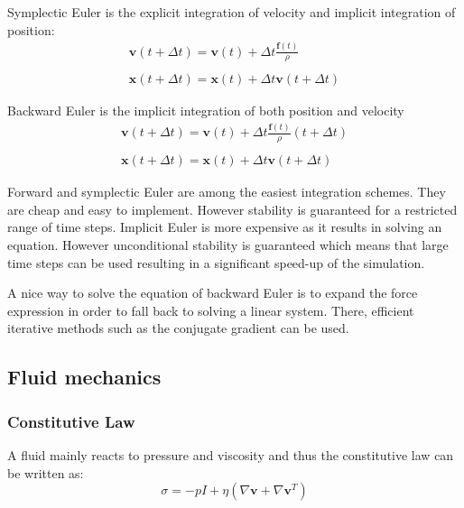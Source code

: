 Symplectic Euler is the explicit integration of velocity and implicit integration of position:
\begin{equation}
\label{eq:symplecticEuler}
\begin{array}{l}
\displaystyle \mathbf{v}(t+\Delta t) = \mathbf{v}(t) + \Delta t \frac{\mathbf{f}(t)}{\rho} \\ \\
\displaystyle \mathbf{x}(t+\Delta t) = \mathbf{x}(t) + \Delta t \mathbf{v}(t+\Delta t)
\end{array}
\end{equation}

Backward Euler is the implicit integration of both position and velocity
\begin{equation}
\label{eq:backwardEuler}
\begin{array}{ll}
\displaystyle \mathbf{v}(t+\Delta t) = \mathbf{v}(t) + \Delta t \frac{\mathbf{f}(t)}{\rho}(t+\Delta t) \\ \\
\displaystyle \mathbf{x}(t+\Delta t) = \mathbf{x}(t) + \Delta t \mathbf{v}(t+\Delta t)
\end{array}
\end{equation}

Forward and symplectic Euler are among the easiest integration schemes. They are cheap and easy to implement. However stability is guaranteed for a restricted range of time steps. Implicit Euler is more expensive as it results in solving an equation. However unconditional stability is guaranteed which means that large time steps can be used resulting in a significant speed-up of the simulation.

A nice way to solve the equation of backward Euler is to expand the force expression in order to fall back to solving a linear system. There, efficient iterative methods such as the conjugate gradient can be used.

\subsection{Fluid mechanics}
\label{subsec:fluidMechanics}

\subsubsection{Constitutive Law}

A fluid mainly reacts to pressure and viscosity and thus the constitutive law can be written as:
\begin{equation}
\label{eq:fluidConstitutiveLaw}
\sigma = -pI + \eta \left( \nabla \mathbf{v} + \nabla \mathbf{v}^{T} \right)
\end{equation}

